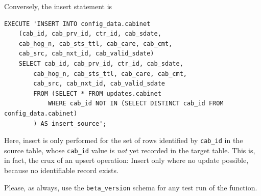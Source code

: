 Conversely, the insert statement is
\begin{lstlisting}[language=postgreSQL]
EXECUTE 'INSERT INTO config_data.cabinet 
	(cab_id, cab_prv_id, ctr_id, cab_sdate, 
	cab_hog_n, cab_sts_ttl, cab_care, cab_cmt, 
	cab_src, cab_nxt_id, cab_valid_sdate) 
	SELECT cab_id, cab_prv_id, ctr_id, cab_sdate, 
	    cab_hog_n, cab_sts_ttl, cab_care, cab_cmt, 
	    cab_src, cab_nxt_id, cab_valid_sdate
		FROM (SELECT * FROM updates.cabinet
			WHERE cab_id NOT IN (SELECT DISTINCT cab_id FROM config_data.cabinet)
		) AS insert_source';
\end{lstlisting}
Here, insert is only performed for the set of rows identified by \texttt{cab\_id} in the source table, whose  \texttt{cab\_id} value is {\em not} yet recorded in the target table. This is, in fact, the crux of an upsert operation: Insert only where no update possible, because no identifiable record exists. 


Please, as always, use the \texttt{beta\_version} schema for any test run of the function.





